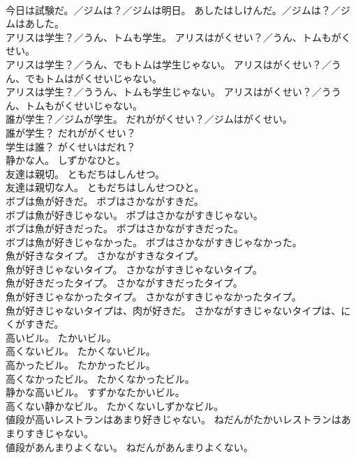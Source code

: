 \documentclass[8pt]{extreport}
\begin{document}
\begin{CJK}{UTF8}{min}
\\	今日は試験だ。／ジムは？／ジムは明日。	あしたはしけんだ。／ジムは？／ジムはあした。 
\\	アリスは学生？／うん、トムも学生。	アリスはがくせい？／うん、トムもがくせい。 
\\	アリスは学生？／うん、でもトムは学生じゃない。	アリスはがくせい？／うん、でもトムはがくせいじゃない。 
\\	アリスは学生？／ううん、トムも学生じゃない。	アリスはがくせい？／ううん、トムもがくせいじゃない。 
\\	誰が学生？／ジムが学生。	だれががくせい？／ジムはがくせい。 
\\	誰が学生？	だれががくせい？ 
\\	学生は誰？	がくせいはだれ？ 
\\	静かな人。	しずかなひと。 
\\	友達は親切。	ともだちはしんせつ。 
\\	友達は親切な人。	ともだちはしんせつひと。 
\\	ボブは魚が好きだ。	ボブはさかながすきだ。 
\\	ボブは魚が好きじゃない。	ボブはさかながすきじゃない。 
\\	ボブは魚が好きだった。	ボブはさかながすきだった。 
\\	ボブは魚が好きじゃなかった。	ボブはさかながすきじゃなかった。 
\\	魚が好きなタイプ。	さかながすきなタイプ。 
\\	魚が好きじゃないタイプ。	さかながすきじゃないタイプ。 
\\	魚が好きだったタイプ。	さかながすきだったタイプ。 
\\	魚が好きじゃなかったタイプ。	さかながすきじゃなかったタイプ。 
\\	魚が好きじゃないタイプは、肉が好きだ。	さかながすきじゃないタイプは、にくがすきだ。 
\\	高いビル。	たかいビル。 
\\	高くないビル。	たかくないビル。 
\\	高かったビル。	たかかったビル。 
\\	高くなかったビル。	たかくなかったビル。 
\\	静かな高いビル。	すずかなたかいビル。 
\\	高くない静かなビル。	たかくないしずかなビル。 
\\	値段が高いレストランはあまり好きじゃない。	ねだんがたかいレストランはあまりすきじゃない。 
\\	値段があんまりよくない。	ねだんがあんまりよくない。 

\end{CJK}
\end{document}
